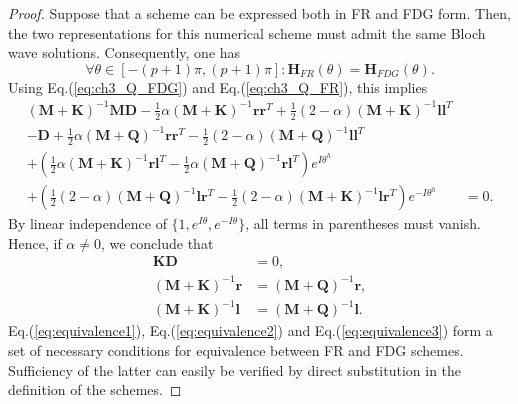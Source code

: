 \documentclass[preprint,12pt]{elsarticle}
\begin{document}
\begin{proof}
Suppose that a scheme can be expressed both in FR and FDG form. Then, the two representations for this numerical scheme must admit the same Bloch wave solutions. Consequently, one has
\begin{equation}
    \forall \theta \in [-(p+1)\pi, (p+1)\pi] : \mathbf{H}_{FR}(\theta) = \mathbf{H}_{FDG}(\theta).
\end{equation}
Using Eq.(\ref{eq:ch3_Q_FDG}) and Eq.(\ref{eq:ch3_Q_FR}), this implies
\begin{align}
    (\mathbf{M}+\mathbf{K})^{-1}\mathbf{M}\mathbf{D}
    - \frac{1}{2}\alpha (\mathbf{M}+\mathbf{K})^{-1}\mathbf{r}\mathbf{r}^T
    + \frac{1}{2}(2-\alpha) (\mathbf{M}+\mathbf{K})^{-1} \mathbf{l}\mathbf{l}^T&
    \\ \nonumber
    - \mathbf{D}
    + \frac{1}{2}\alpha(\mathbf{M}+\mathbf{Q})^{-1} \mathbf{r}\mathbf{r}^T
    - \frac{1}{2}(2-\alpha)(\mathbf{M}+\mathbf{Q})^{-1} \mathbf{l}\mathbf{l}^T&
    \nonumber \\
    +
    \left(
    \frac{1}{2}\alpha (\mathbf{M}+\mathbf{K})^{-1} \mathbf{r} \mathbf{l}^T
    -\frac{1}{2}\alpha (\mathbf{M} + \mathbf{Q})^{-1} \mathbf{r} \mathbf{l}^T
    \right) e^{I\theta^h}& \nonumber \\
    +
    \left(
    \frac{1}{2}(2-\alpha) (\mathbf{M} + \mathbf{Q})^{-1} \mathbf{l} \mathbf{r}^{T}
    -\frac{1}{2}(2-\alpha) (\mathbf{M}+\mathbf{K})^{-1} \mathbf{l} \mathbf{r}^T
    \right) e^{-I\theta^h}&
    =
    0.
\end{align}
By linear independence of $\{1,e^{I\theta}, e^{-I\theta}\}$, all terms in parentheses must vanish. Hence, if $\alpha \neq 0$, we conclude that
\begin{align}
    \mathbf{K}\mathbf{D} &= 0 \label{eq:equivalence1}, \\
    (\mathbf{M} + \mathbf{K})^{-1} \mathbf{r} &= (\mathbf{M} + \mathbf{Q})^{-1} \mathbf{r}, \label{eq:equivalence2}\\
    (\mathbf{M} + \mathbf{K})^{-1} \mathbf{l} &= (\mathbf{M} + \mathbf{Q})^{-1} \mathbf{l} \label{eq:equivalence3}.
\end{align}
Eq.(\ref{eq:equivalence1}), Eq.(\ref{eq:equivalence2}) and Eq.(\ref{eq:equivalence3}) form a set of necessary conditions for equivalence between FR and FDG schemes. Sufficiency of the latter can easily be verified by direct substitution in the definition of the schemes.
\end{proof}
\end{document}
